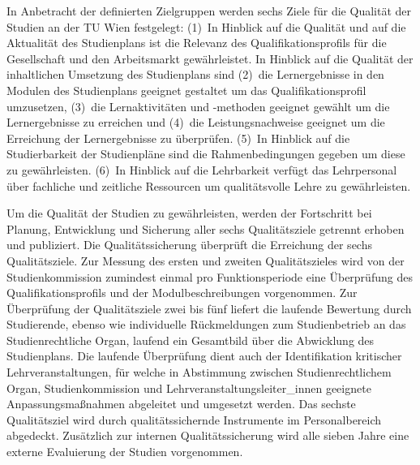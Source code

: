 In Anbetracht der definierten Zielgruppen werden sechs Ziele für die
Qualität der Studien an der TU Wien festgelegt: (1)~In Hinblick auf
die Qualität und auf die Aktualität des Studienplans ist die Relevanz
des Qualifikationsprofils für die Gesellschaft und den Arbeitsmarkt
gewährleistet.  In Hinblick auf die Qualität der inhaltlichen
Umsetzung des Studienplans sind (2)~die Lernergebnisse in den Modulen
des Studienplans geeignet gestaltet um das Qualifikationsprofil
umzusetzen, (3)~die Lernaktivitäten und -methoden geeignet gewählt um
die Lernergebnisse zu erreichen und (4)~die Leistungsnachweise
geeignet um die Erreichung der Lernergebnisse zu überprüfen.  (5)~In
Hinblick auf die Studierbarkeit der Studienpläne sind die
Rahmenbedingungen gegeben um diese zu gewährleisten.  (6)~In Hinblick
auf die Lehrbarkeit verfügt das Lehrpersonal über fachliche und
zeitliche Ressourcen um qualitätsvolle Lehre zu gewährleisten.
\medskip

Um die Qualität der Studien zu gewährleisten, werden der Fortschritt
bei Planung, Entwicklung und Sicherung aller sechs Qualitätsziele
getrennt erhoben und publiziert. Die Qualitätssicherung überprüft die
Erreichung der sechs Qualitätsziele. Zur Messung des ersten und
zweiten Qualitätszieles wird von der Studienkommission zumindest
einmal pro Funktionsperiode eine Überprüfung des Qualifikationsprofils
und der Modulbeschreibungen vorgenommen. Zur Überprüfung der
Qualitätsziele zwei bis fünf liefert die laufende Bewertung durch
Studierende, ebenso wie individuelle Rückmeldungen zum Studienbetrieb
an das Studienrechtliche Organ, laufend ein Gesamtbild über die
Abwicklung des Studienplans. Die laufende Überprüfung dient auch der
Identifikation kritischer Lehrveranstaltungen, für welche in
Abstimmung zwischen Studienrechtlichem Organ, Studienkommission und
Lehrveranstaltungsleiter\_innen 
geeignete Anpassungsmaßnahmen abgeleitet und umgesetzt werden. Das sechste
Qualitätsziel wird durch qualitätssichernde Instrumente im
Personalbereich abgedeckt. Zusätzlich zur internen Qualitätssicherung
wird alle sieben Jahre eine externe Evaluierung der Studien
vorgenommen.

%

